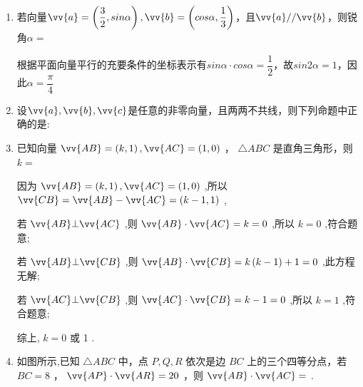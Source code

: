 \begin{enumerate}
    \item 若向量$\vv{a} = \left(\dfrac{3}{2}, sin\alpha\right), \vv{b} = \left(cos\alpha, \dfrac{1}{3}\right)$，且$\vv{a} // \vv{b}$，则锐角$\alpha = $
    \begin{jieda}
        根据平面向量平行的充要条件的坐标表示有$sin\alpha \cdot cos\alpha = \dfrac{1}{2}$，故$sin2\alpha = 1$，因此$\alpha = \dfrac{\pi}{4}$
    \end{jieda}

    \item 设$\vv{a}, \vv{b}, \vv{c}$是任意的非零向量，且两两不共线，则下列命题中正确的是:


    \item 已知向量 $\vv{AB} = \left( {k,1}\right) ,\vv{AC} = \left( {1,0}\right)$ ， $\bigtriangleup  {ABC}$ 是直角三角形，则 $k =$ 
    \begin{jieda}
        因为 $\vv{AB} = \left( {k,1}\right) ,\vv{AC} = \left( {1,0}\right)$ ,所以 $\vv{CB} = \vv{AB} - \vv{AC} = \left( {k - 1,1}\right)$ ,
        
        若 $\vv{AB} \bot  \vv{AC}$ ,则 $\vv{AB} \cdot  \vv{AC} = k = 0$ ,所以 $k = 0$ ,符合题意;
        
        若 $\vv{AB} \bot  \vv{CB}$ ,则 $\vv{AB} \cdot  \vv{CB} = k\left( {k - 1}\right)  + 1 = 0$ ,此方程无解;
        
        若 $\vv{AC} \bot  \vv{CB}$ ,则 $\vv{AC} \cdot  \vv{CB} = k - 1 = 0$ ,所以 $k = 1$ ,符合题意;
        
        综上, $k = 0$ 或 1 .
    \end{jieda}

    \item 如图所示,已知 $\bigtriangleup  {ABC}$ 中，点 $P,Q,R$ 依次是边 ${BC}$ 上的三个四等分点，若 ${BC} = 8$ ， $\vv{AP} \cdot  \vv{AR} = {20}$ ，则 $\vv{AB} \cdot  \vv{AC} =$ .
    

\end{enumerate}
